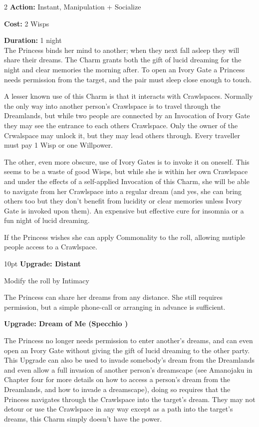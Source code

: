 \begin{multicols}{2}
\noindent \textbf{Action:} Instant, Manipulation + Socialize

\noindent \textbf{Cost:} 2 Wisps

\noindent \textbf{Duration:} 1 night \\

\noindent The Princess binds her mind to another; when they next fall asleep they will share their dreams. The Charm grants both the gift of lucid dreaming for the night and clear memories the morning after. To open an Ivory Gate a Princess needs permission from the target, and the pair must sleep close enough to touch.

A lesser known use of this Charm is that it interacts with Crawlspaces. Normally the only way into another person's Crawlspace is to travel through the Dreamlands, but while two people are connected by an Invocation of Ivory Gate they may see the entrance to each others Crawlspace. Only the owner of the Crwalspace may unlock it, but they may lead others through. Every traveller must pay 1 Wisp or one Willpower.  

The other, even more obscure, use of Ivory Gates is to invoke it on oneself. This seems to be a waste of good Wisps, but while she is within her own Crawlspace and under the effects of a self-applied Invocation of this Charm, she will be able to navigate from her Crawlspace into a regular dream (and yes, she can bring others too but they don't benefit from lucidity or clear memories unless Ivory Gate is invoked upon them). An expensive but effective cure for insomnia or a fun night of lucid dreaming. 

If the Princess wishes she can apply Commonality to the roll, allowing mutiple people access to a Crawlspace.

\begin{myindentpar}{10pt} \textbf{Upgrade: Distant}

\noindent Modify the roll by Intimacy

The Princess can share her dreams from any distance. She still requires permission, but a simple phone-call or arranging in advance is sufficient. 

\textbf{Upgrade: Dream of Me (Specchio \textbullet\textbullet)}

The Princess no longer needs permission to enter another's dreams, and can even open an Ivory Gate without giving the gift of lucid dreaming to the other party. This Upgrade can also be used to invade somebody's dream from the Dreamlands and even allow a full invasion of another person's dreamscape (see Amanojaku in Chapter four for more details on how to access a person's dream from the Dreamlands, and how to invade a dreamscape), doing so requires that the Princess navigates through the Crawlspace into the target's dream. They may not detour or use the Crawlspace in any way except as a path into the target's dreams, this Charm simply doesn’t have the power. 


\end{myindentpar}
\end{multicols}
